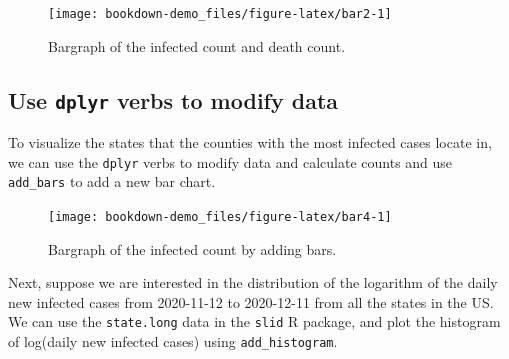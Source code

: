 \documentclass[]{book}
\newenvironment{Shaded}{\begin{snugshade}}{\end{snugshade}}
\newcommand{\KeywordTok}[1]{\textcolor[rgb]{0.13,0.29,0.53}{\textbf{#1}}}
\newcommand{\DataTypeTok}[1]{\textcolor[rgb]{0.13,0.29,0.53}{#1}}
\newcommand{\StringTok}[1]{\textcolor[rgb]{0.31,0.60,0.02}{#1}}
\newcommand{\OperatorTok}[1]{\textcolor[rgb]{0.81,0.36,0.00}{\textbf{#1}}}
\newcommand{\NormalTok}[1]{#1}
\begin{document}
\begin{figure}

{\centering \texttt{[image: bookdown-demo\_files/figure-latex/bar2-1]} 

}

\caption{Bargraph of the infected count and death count.}\label{fig:bar2}
\end{figure}

\subsection{\texorpdfstring{Use \texttt{dplyr} verbs to modify
data}{Use dplyr verbs to modify data}}\label{use-dplyr-verbs-to-modify-data}

To visualize the states that the counties with the most infected cases
locate in, we can use the \texttt{dplyr} verbs to modify data and
calculate counts and use \texttt{add\_bars} to add a new bar chart.

\begin{Shaded}
\end{Shaded}

\begin{figure}

{\centering \texttt{[image: bookdown-demo\_files/figure-latex/bar4-1]} 

}

\caption{Bargraph of the infected count by adding bars.}\label{fig:bar4}
\end{figure}

Next, suppose we are interested in the distribution of the logarithm of
the daily new infected cases from 2020-11-12 to 2020-12-11 from all the
states in the US. We can use the \texttt{state.long} data in the
\texttt{slid} R package, and plot the histogram of log(daily new
infected cases) using \texttt{add\_histogram}.
\end{document}
